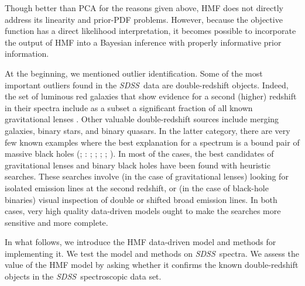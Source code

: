 \documentclass[12pt,preprint]{aastex}
\newcommand{\project}[1]{\textsl{#1}}
\newcommand{\sdss}{\project{SDSS}}
\begin{document}
Though better than PCA for the reasons given above, HMF does not
directly address its linearity and prior-PDF problems.  However,
because the objective function has a direct likelihood interpretation,
it becomes possible to incorporate the output of HMF into a Bayesian
inference with properly informative prior information.

At the beginning, we mentioned outlier identification.  Some of the
most important outliers found in the \sdss\ data are double-redshift
objects.  Indeed, the set of luminous red galaxies that show evidence
for a second (higher) redshift in their spectra include as a subset a
significant fraction of all known gravitational lenses \citep{bolton}.
Other valuable double-redshift sources include merging galaxies,
binary stars, and binary quasars.  In the latter category, there are
very few known examples where the best explanation for a spectrum is a
bound pair of massive black holes (\citealt{komossa};
\citealt{shields}: \citealt{boroson}; \citealt{decarli}; \citealt{barrows11}; 
\citealt{eracleous}; \citealt{tsalmantza}).  In most of the cases, the best
candidates  of gravitational lenses and binary black holes have been 
found with heuristic searches.  These searches
involve (in the case of gravitational lenses) looking for isolated
emission lines at the second redshift, or (in the case of black-hole
binaries) visual inspection of double or shifted broad emission lines.
In both cases, very high quality data-driven models ought to make the
searches more sensitive and more complete.

In what follows, we introduce the HMF data-driven model and methods
for implementing it.  We test the model and methods on \sdss\ spectra.
We assess the value of the HMF model by asking whether it confirms the
known double-redshift objects in the \sdss\ spectroscopic data set.
\end{document}
